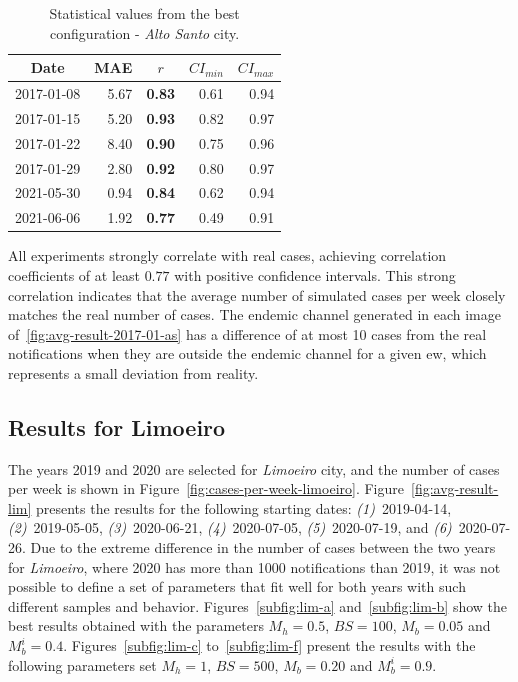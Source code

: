 \begin{table}[!ht]
	\centering
	\caption{Statistical values from the best configuration - \textit{Alto Santo} city.}
	\label{tab:statistical-data-as}
	\small{%
		\begin{tabular}{lrrrr}
			\toprule
			\multicolumn{1}{c}{\textbf{Date}}       &
			\multicolumn{1}{c}{\textbf{MAE}}        &
			\multicolumn{1}{c}{\textbf{$r$}}        &
			\multicolumn{1}{c}{\textbf{$CI_{min}$}} &
			\multicolumn{1}{c}{\textbf{$CI_{max}$}}                                      \\ \midrule
			2017-01-08                              & 5.67 & \textbf{0.83} & 0.61 & 0.94 \\
			2017-01-15                              & 5.20 & \textbf{0.93} & 0.82 & 0.97 \\
			2017-01-22                              & 8.40 & \textbf{0.90} & 0.75 & 0.96 \\
			2017-01-29                              & 2.80 & \textbf{0.92} & 0.80 & 0.97 \\
			2021-05-30                              & 0.94 & \textbf{0.84} & 0.62 & 0.94 \\
			2021-06-06                              & 1.92 & \textbf{0.77} & 0.49 & 0.91 \\ \bottomrule
		\end{tabular}%
	}
\end{table}

All experiments strongly correlate with real cases, achieving correlation
coefficients of at least $0.77$ with positive confidence intervals. This strong
correlation indicates that the average number of simulated cases per week
closely matches the real number of cases. The endemic channel generated in each
image of~\ref{fig:avg-result-2017-01-as} has a difference of at most 10 cases
from the real notifications when they are outside the endemic channel for a
given \gls{ew}, which represents a small deviation from reality.

\subsection{Results for Limoeiro}

The years 2019 and 2020 are selected for \textit{Limoeiro} city, and the number
of cases per week is shown in Figure~\ref{fig:cases-per-week-limoeiro}.
Figure~\ref{fig:avg-result-lim} presents the results for the following starting
dates: \textit{(1)}~2019-04-14, \textit{(2)}~2019-05-05,
\textit{(3)}~2020-06-21, \textit{(4)}~2020-07-05, \textit{(5)}~2020-07-19, and
\textit{(6)}~2020-07-26. Due to the extreme difference in the number of cases
between the two years for \textit{Limoeiro}, where 2020 has more than 1000
notifications than 2019, it was not possible to define a set of parameters that
fit well for both years with such different samples and behavior.
Figures~\ref{subfig:lim-a} and~\ref{subfig:lim-b} show the best results obtained
with the parameters $M_h = 0.5$, $BS = 100$, $M_b = 0.05$ and $M_b^{i} = 0.4$.
Figures~\ref{subfig:lim-c} to~\ref{subfig:lim-f} present the results with the
following parameters set $M_h = 1$, $BS = 500$, $M_b = 0.20$ and $M_b^{i} =
	0.9$.


